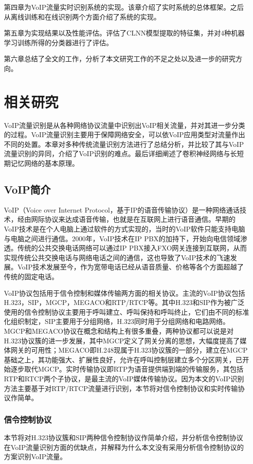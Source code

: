 第四章为VoIP流量实时识别系统的实现。该章介绍了实时系统的总体框架。之后从离线训练和在线识别两个方面介绍了系统的实现。

第五章为实现结果以及性能评估。评估了CLNN模型提取的特征集，并对4种机器学习训练所得的分类器进行了评估。

第六章总结了全文的工作，分析了本文研究工作的不足之处以及进一步的研究方向。


\chapter{相关研究}
VoIP流量识别是从各种网络协议流量中识别出VoIP相关流量，并对其进一步分类的过程。VoIP流量识别主要用于保障网络安全，可以依VoIP应用类型对流量作出不同的处置。本章对多种传统流量识别方法进行了总结分析，并比较了其与VoIP流量识别的异同，介绍了VoIP识别的难点。最后详细阐述了卷积神经网络与长短期记忆网络的基本原理。

\section{VoIP简介}
VoIP（Voice over Internet Protocol，基于IP的语音传输协议）是一种网络通话技术，经由网际协议来达成语音传输，也就是在互联网上进行语音通信。早期的VoIP技术是在个人电脑上通过软件的方式实现的，当时的VoIP软件只能支持电脑与电脑之间进行通信。2000年，VoIP技术在IP PBX的加持下，开始向电信领域渗透。传统的公共交换电话网络可以通过IP PBX接入FXO网关连接到互联网，从而实现传统公共交换电话与网络电话之间的通信，这也导致了VoIP技术的飞速发展。VoIP技术发展至今，作为宽带电话已经从语音质量、价格等各个方面超越了传统的固定电话。

VoIP协议包括用于信令控制和媒体传输两方面的相关协议。主流的VoIP协议包括H.323，SIP，MGCP，MEGACO和RTP/RTCP等。其中H.323和SIP作为被广泛使用的信令控制协议主要用于呼叫建立、呼叫保持和呼叫终止，它们由不同的标准化组织制定，SIP主要用于分组网络，H.323同时用于分组网络和电路网络。MGCP和MEGACO协议在概念和结构上有很多重叠，两种协议都可以说是对H.323协议簇的进一步发展，其中MGCP定义了网关分离的思想，大幅度提高了媒体网关的可用性；MEGACO即H.248现属于H.323协议簇的一部分，建立在MGCP基础之上，其功能强大、扩展性良好，允许在呼叫控制层建立多个分区网关，已开始逐步取代MGCP。实时传输协议即RTP为语音提供端到端的传输服务，其包括RTP和RTCP两个子协议，是最主流的VoIP媒体传输协议。因为本文的VoIP识别方法主要基于对RTP/RTCP流量进行识别，本节将对信令控制协议和实时传输协议作简单。

\subsection{信令控制协议}
本节将对H.323协议簇和SIP两种信令控制协议作简单介绍，并分析信令控制协议在VoIP流量识别方面的优缺点，并解释为什么本文没有采用分析信令控制协议的方案识别VoIP流量。
